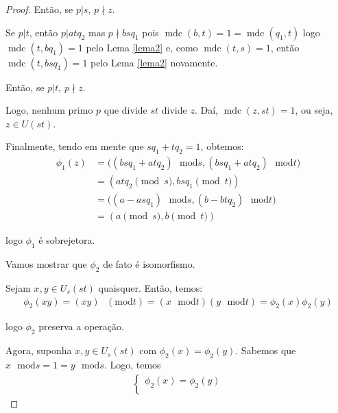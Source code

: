 \documentclass[a4paper,portuguese,11pt,twoside, leqno]{book}
\DeclareMathOperator{\mdc}{mdc}
\theoremstyle{definition}
\begin{document}
\begin{proof}
		\par\vspace{0.3cm} Então, se $p|s$, $p\nmid z$. 
		\par\vspace{0.3cm} Se $p|t$, então $p|atq_2$ mas $p\nmid bsq_1$ pois $\mdc(b,t) = 1 = \mdc(q_1,t)$ logo $\mdc(t,bq_1) = 1$ pelo Lema \eqref{lema2} e, como $\mdc(t,s) = 1$, então $\mdc(t,bsq_1) = 1$ pelo Lema \eqref{lema2} novamente.
		\par\vspace{0.3cm} Então, se $p|t$, $p\nmid z$. 
		\par\vspace{0.3cm} Logo, nenhum primo $p$ que divide $st$ divide $z$. Daí, $\mdc(z,st) = 1$, ou seja, $z\in U(st)$.
		\par\vspace{0.3cm} Finalmente, tendo em mente que $sq_1 + tq_2 = 1$, obtemos:
		\begin{align*}
		\phi_1(z) &= \Big((bsq_1 + atq_2)\text{ }\mathrm{mod} s , (bsq_1 + atq_2)\text{ }\mathrm{mod} t\Big) \\ &= ( atq_2\pmod s, bsq_1\pmod t) \\ &= \Big((a - asq_1)\text{ }\mathrm{mod} s , (b - btq_2)\text{ }\mathrm{mod} t \Big) \\ &= (a\pmod s, b\pmod t)
		\end{align*}
		\par\vspace{0.3cm}logo $\phi_1$ é sobrejetora.
		\vspace{0.3cm}\par Vamos mostrar que $\phi_2$ de fato é isomorfismo.
		\par\vspace{0.3cm} Sejam $x, y\in U_s(st)$ quaisquer. Então, temos:
		\begin{align*}
		\phi_2(xy) = (xy)\text{ }(\mathrm{mod} t) = (x\text{ }\mathrm{mod} t)(y\text{ }\mathrm{mod} t) = \phi_2(x)\phi_2(y)
		\end{align*}
		\par\vspace{0.3cm}logo $\phi_2$ preserva a operação.
		\par\vspace{0.3cm} Agora, suponha $x,y\in U_s(st)$ com $\phi_2(x) = \phi_2(y)$. Sabemos que $x\text{ }\mathrm{mod} s = 1 = y\text{ }\mathrm{mod} s$. Logo, temos
		\begin{align*}
		\begin{cases}
		\phi_2(x) = \phi_2(y) \\

\end{cases}
\end{align*}
\end{proof}
\end{document}
